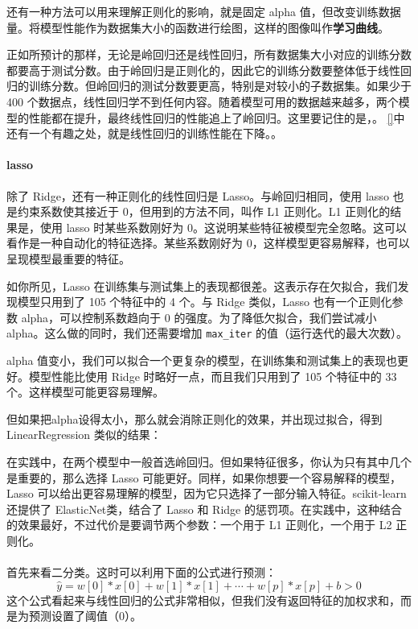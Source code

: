 还有一种方法可以用来理解正则化的影响，就是固定 alpha 值，但改变训练数据量。将模型性能作为数据集大小的函数进行绘图，这样的图像叫作\textbf{学习曲线}。

正如所预计的那样，无论是岭回归还是线性回归，所有数据集大小对应的训练分数都要高于测试分数。由于岭回归是正则化的，因此它的训练分数要整体低于线性回归的训练分数。但岭回归的测试分数要更高，特别是对较小的子数据集。如果少于 400 个数据点，线性回归学不到任何内容。随着模型可用的数据越来越多，两个模型的性能都在提升，最终线性回归的性能追上了岭回归。这里要记住的是，。 \autoref{}中还有一个有趣之处，就是线性回归的训练性能在下降。。

\paragraph{lasso} 除了 Ridge，还有一种正则化的线性回归是 Lasso。与岭回归相同，使用 lasso 也是约束系数使其接近于 0，但用到的方法不同，叫作 L1 正则化。L1 正则化的结果是，使用 lasso 时某些系数刚好为 0。这说明某些特征被模型完全忽略。这可以看作是一种自动化的特征选择。某些系数刚好为 0，这样模型更容易解释，也可以呈现模型最重要的特征。

如你所见，Lasso 在训练集与测试集上的表现都很差。这表示存在欠拟合，我们发现模型只用到了 105 个特征中的 4 个。与 Ridge 类似，Lasso 也有一个正则化参数 alpha，可以控制系数趋向于 0 的强度。为了降低欠拟合，我们尝试减小 alpha。这么做的同时，我们还需要增加 \verb|max_iter| 的值（运行迭代的最大次数）。

alpha 值变小，我们可以拟合一个更复杂的模型，在训练集和测试集上的表现也更好。模型性能比使用 Ridge 时略好一点，而且我们只用到了 105 个特征中的 33 个。这样模型可能更容易理解。

但如果把alpha设得太小，那么就会消除正则化的效果，并出现过拟合，得到LinearRegression 类似的结果：



在实践中，在两个模型中一般首选岭回归。但如果特征很多，你认为只有其中几个是重要的，那么选择 Lasso 可能更好。同样，如果你想要一个容易解释的模型，Lasso 可以给出更容易理解的模型，因为它只选择了一部分输入特征。scikit-learn 还提供了 ElasticNet类，结合了 Lasso 和 Ridge 的惩罚项。在实践中，这种结合的效果最好，不过代价是要调节两个参数：一个用于 L1 正则化，一个用于 L2 正则化。

\paragraph{} 首先来看二分类。这时可以利用下面的公式进行预测：
\begin{equation*}
    \hat{y} = w[0] * x[0] + w[1] * x[1] + \cdots + w[p] * x[p] + b > 0
\end{equation*}
这个公式看起来与线性回归的公式非常相似，但我们没有返回特征的加权求和，而是为预测设置了阈值（0）。

